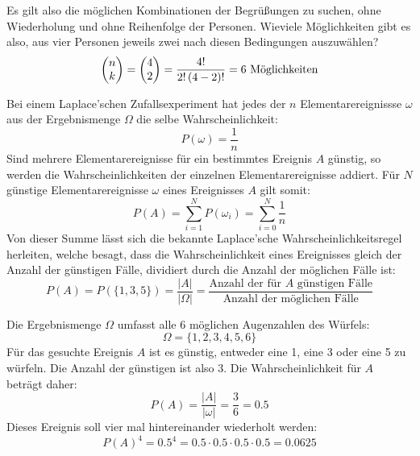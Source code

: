 Es gilt also die m\"{o}glichen Kombinationen der Begr\"{u}\ss{}ungen zu suchen, ohne Wiederholung und ohne Reihenfolge der Personen. Wieviele M\"{o}glichkeiten gibt es also, aus vier Personen jeweils zwei nach diesen Bedingungen auszuw\"{a}hlen? $$\begin{pmatrix}n \\ k\end{pmatrix} = \begin{pmatrix}4 \\ 2\end{pmatrix} = \frac{4!}{2! \, (4 - 2)!} = 6 \text{ M\"{o}glichkeiten}$$

\pagebreak


Bei einem Laplace'schen Zufallsexperiment hat jedes der $n$ Elementarereignissse $\omega$ aus der Ergebnismenge $\Omega$ die selbe Wahrscheinlichkeit: $$P(\omega) = \frac{1}{n}$$ Sind mehrere Elementarereignisse f\"{u}r ein bestimmtes Ereignis $A$ g\"{u}nstig, so werden die Wahrscheinlichkeiten der einzelnen Elementarereignisse addiert. F\"{u}r $N$ g\"{u}nstige Elementarereignisse $\omega$ eines Ereignisses $A$ gilt somit: $$P(A) = \sum_{i=1}^{N} P(\omega_i) = \sum_{i=0}^{N} \frac{1}{n}$$ Von dieser Summe l\"{a}sst sich die bekannte Laplace'sche Wahrscheinlichkeitsregel herleiten, welche besagt, dass die Wahrscheinlichkeit eines Ereignisses gleich der Anzahl der g\"{u}nstigen F\"{a}lle, dividiert durch die Anzahl der m\"{o}glichen F\"{a}lle ist: $$P(A) = P(\{1, 3, 5\}) = \frac{|A|}{|\Omega|} = \frac{\text{Anzahl der f\"{u}r $A$ g\"{u}nstigen F\"{a}lle}}{\text{Anzahl der m\"{o}glichen F\"{a}lle}}$$


Die Ergebnismenge $\Omega$ umfasst alle 6 m\"{o}glichen Augenzahlen des W\"{u}rfels: $$\Omega = \{ 1, 2, 3, 4, 5, 6\}$$ F\"{u}r das gesuchte Ereignis $A$ ist es g\"{u}nstig, entweder eine 1, eine 3 oder eine 5 zu w\"{u}rfeln. Die Anzahl der g\"{u}nstigen ist also 3. Die Wahrscheinlichkeit f\"{u}r $A$ betr\"{a}gt daher: $$P(A) = \frac{|A|}{|\omega|} = \frac{3}{6} = 0.5$$ Dieses Ereignis soll vier mal hintereinander wiederholt werden: $$P(A)^4 = 0.5^4 = 0.5 \cdot 0.5 \cdot 0.5 \cdot 0.5 = 0.0625$$


